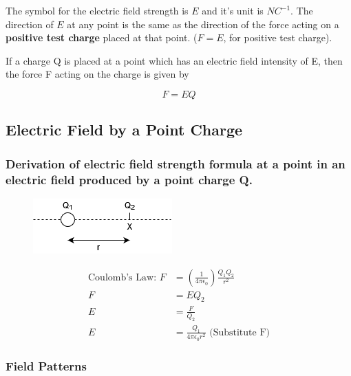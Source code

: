 \documentclass[../../../main.tex]{subfiles}
\begin{document}
The symbol for the electric field strength is \(E\) and it's unit is \(NC^{-1}\).
The direction of \(E\) at any point is the same as the direction of the force acting on a \textbf{positive test charge} placed at that point. (\(F=E\), for positive test charge).

\bigskip

If a charge Q is placed at a point which has an electric field intensity of E, then the force F acting on the charge is given by

\begin{equation}
    F=EQ
\end{equation}

\subsection{Electric Field by a Point Charge}

\subsubsection{Derivation of electric field strength formula at a point in an electric field produced by a point charge Q.}

\begin{figure}[h]
    \includegraphics[]{figures/1.png}
    \centering
\end{figure}

\begin{align*}
    \text{Coulomb's Law: } F & =(\frac{1}{4\pi\epsilon_0})\frac{Q_1Q_2}{r^2}         \\
    F                        & =EQ_2                                                 \\
    E                        & =\frac{F}{Q_2}                                        \\
    E                        & =\frac{Q_1}{4\pi\epsilon_0r^2} \text{ (Substitute F)}
\end{align*}

\newpage

\subsubsection{Field Patterns}
\end{document}
